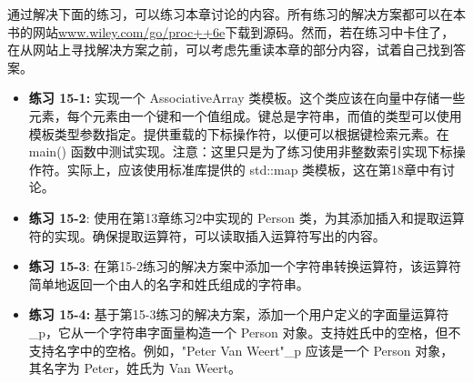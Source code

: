 通过解决下面的练习，可以练习本章讨论的内容。所有练习的解决方案都可以在本书的网站\url{www.wiley.com/go/proc++6e}下载到源码。然而，若在练习中卡住了，在从网站上寻找解决方案之前，可以考虑先重读本章的部分内容，试着自己找到答案。

\begin{itemize}
\item
\textbf{练习 15-1:} 实现一个 AssociativeArray 类模板。这个类应该在向量中存储一些元素，每个元素由一个键和一个值组成。键总是字符串，而值的类型可以使用模板类型参数指定。提供重载的下标操作符，以便可以根据键检索元素。在 main() 函数中测试实现。注意：这里只是为了练习使用非整数索引实现下标操作符。实际上，应该使用标准库提供的 std::map 类模板，这在第18章中有讨论。

\item
\textbf{练习 15-2}: 使用在第13章练习2中实现的 Person 类，为其添加插入和提取运算符的实现。确保提取运算符，可以读取插入运算符写出的内容。

\item
\textbf{练习 15-3}: 在第15-2练习的解决方案中添加一个字符串转换运算符，该运算符简单地返回一个由人的名字和姓氏组成的字符串。

\item
\textbf{练习 15-4:} 基于第15-3练习的解决方案，添加一个用户定义的字面量运算符 \_p，它从一个字符串字面量构造一个 Person 对象。支持姓氏中的空格，但不支持名字中的空格。例如，"Peter Van Weert"\_p 应该是一个 Person 对象，其名字为 Peter，姓氏为 Van Weert。
\end{itemize}












